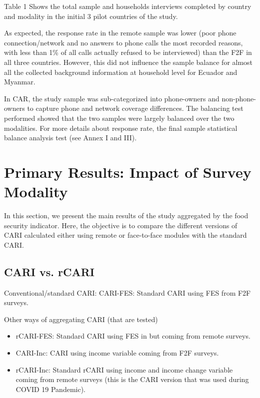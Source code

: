 \documentclass[11pt,harvard]{article}
\begin{document}
Table 1 Shows the total sample and households interviews completed by country and modality in the initial 3 pilot countries of the study.

 
\label{tab:rCARI_Overall_Completion}

As expected, the response rate in the remote sample was lower (poor phone connection/network and no answers to phone calls the most recorded reasons, with less than 1\% of all calls actually refused to be interviewed) than the F2F in all three countries. However, this did not influence the sample balance for almost all the collected background information at household level for Ecuador and Myanmar.
 
In CAR, the study sample was sub-categorized into phone-owners and non-phone-owners to capture phone and network coverage differences. The balancing test performed showed that the two samples were largely balanced over the two modalities. For more details about response rate, the final sample statistical balance analysis test (see Annex I and III).


\pagebreak

\section{Primary Results: Impact of Survey Modality}

In this section, we present the main results of the study aggregated by the food security indicator. Here, the objective is to compare the different versions of CARI calculated either using remote or face-to-face modules with the standard CARI.

\subsection{CARI vs. rCARI}

Conventional/standard CARI:  CARI-FES: Standard CARI using FES from F2F surveys.

Other ways of aggregating CARI (that are tested)
\begin{itemize}[label=--, left=1.5em]
	\item rCARI-FES: Standard CARI using FES in but coming from remote surveys.
	\item CARI-Inc: CARI using income variable coming from F2F surveys.
	\item rCARI-Inc: Standard rCARI using income and income change variable coming from remote surveys (this is the CARI version that was used during COVID 19 Pandemic).
\end{itemize}
\end{document}
